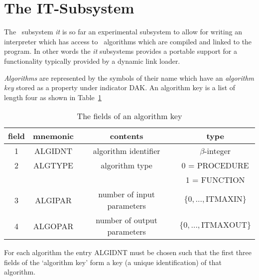 \section{The IT-Subsystem} \label{se:it}

The \redux\ subsystem {\it it} is so far an experimental subsystem to allow
for writing an interpreter which has access to \ALDES\  algorithms
which are compiled and linked to the program.
In other words the {\it it} subsystems provides a portable support for a
functionality typically provided by a dynamic link loader.

{\em Algorithms}
are represented by the symbols of their name which have an
{\em algorithm key} stored as a property under indicator DAK.
An algorithm key is a list of length four as shown in Table~\ref{ta:ak}
\begin{table}
\begin{center}
\begin{tabular}{|c|c|c|c|}
 \hline
 field  & mnemonic &  contents & type \\
 \hline\hline
 1 & ALGIDNT & algorithm identifier & $\beta$-integer \\
 \hline
 2 & ALGTYPE & algorithm type       & 0 = PROCEDURE \\
   &         &                      & 1 = FUNCTION \\
 \hline
 3 & ALGIPAR & number of input parameters & $\{0, \ldots, \mbox{ITMAXIN} \}$ \\
 \hline
 4 & ALGOPAR & number of output parameters & $\{0, \ldots, \mbox{ITMAXOUT}\}$ \\
 \hline
\end{tabular}
\caption{The fields of an algorithm key} \label{ta:ak}
\end{center}
\end{table}
For each algorithm the entry ALGIDNT must be chosen such that the first
three fields of the `algorithm key' form a key (a unique identification) of
that algorithm.

